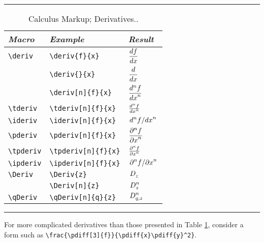 \documentclass[twoside]{article}
\newenvironment{Table}[1]{%
   \begin{table}[htb]\hrule\begin{centering}\caption{#1}}{%
   \par\end{centering}\hrule\end{table}}
\newenvironment{Tabular}[1]{%
   \begingroup\def\arraystretch{1.3}\small \begin{tabular}{#1}}{%
   \end{tabular}\endgroup}
\begin{document}
\begin{Table}{Calculus Markup; Derivatives.\label{tab:derivmarkup}.}
\begin{Tabular}{lll}
\textit{Macro} & \textit{Example} & \textit{Result} \\\hline
\verb|\deriv| &\verb|\deriv{f}{x}| & $\displaystyle\deriv{f}{x}$ \\
              &\verb|\deriv{}{x}| & $\displaystyle\deriv{}{x}$ \\
              &\verb|\deriv[n]{f}{x}| & $\displaystyle\deriv[n]{f}{x}$ \\
\verb|\tderiv| &\verb|\tderiv[n]{f}{x}| & $\displaystyle\tderiv[n]{f}{x}$ \\
\verb|\ideriv| &\verb|\ideriv[n]{f}{x}| & $\displaystyle\ideriv[n]{f}{x}$ \\
\verb|\pderiv| &\verb|\pderiv[n]{f}{x}| & $\displaystyle\pderiv[n]{f}{x}$ \\
\verb|\tpderiv| &\verb|\tpderiv[n]{f}{x}| & $\displaystyle\tpderiv[n]{f}{x}$ \\
\verb|\ipderiv| &\verb|\ipderiv[n]{f}{x}| & $\displaystyle\ipderiv[n]{f}{x}$ \\
\verb|\Deriv| & \verb|\Deriv{z}| & $\displaystyle\Deriv{z}$ \\
              & \verb|\Deriv[n]{z}| & $\displaystyle\Deriv[n]{z}$ \\
\verb|\qDeriv| & \verb|\qDeriv[n]{q}{z}| & $\displaystyle\qDeriv[n]{q}{z}$ \\
\end{Tabular}
\end{Table}
For more complicated derivatives than those presented in Table \ref{tab:derivmarkup},
 consider a form such as \verb|\frac{\pdiff[3]{f}}{\pdiff{x}\pdiff{y}^2}|.
\end{document}
